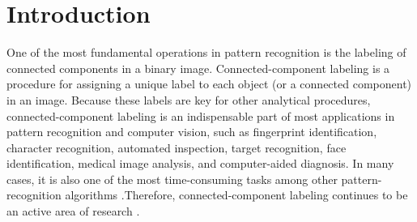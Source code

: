 \section{Introduction}

One of the most fundamental operations in pattern recognition is the labeling of connected components in a binary image. Connected-component labeling is a procedure for assigning a unique label to each object (or a connected component) in an image. Because these labels are key for other analytical procedures, connected-component labeling is an indispensable part of most applications in pattern recognition and computer vision, such as fingerprint identification, character recognition, automated inspection, target recognition, face identification, medical image analysis, and computer-aided diagnosis. In many cases, it is also one of the most time-consuming tasks among other pattern-recognition algorithms \cite{Alnuweiri1992_Parallel}.Therefore, connected-component labeling continues to be an active area of research \cite{Gonzales_Digital,Agarwal2006_Efficient,Chang2004_Linear,Hayashi2001_Fast,Hu2005_Fast,Knop1998_Parallel,Moga1997_Parallel,Wang2003_Parallel}.

